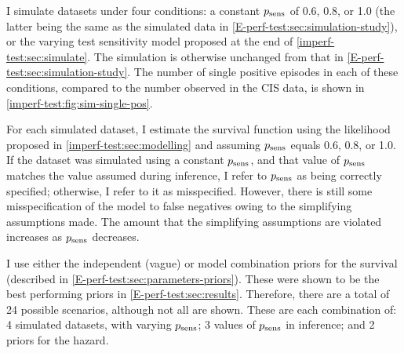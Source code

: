 \documentclass[thesis.tex]{subfiles}
\begin{document}
I simulate datasets under four conditions: a constant $p_\text{sens}$ of 0.6, 0.8, or 1.0 (the latter being the same as the simulated data in \cref{E-perf-test:sec:simulation-study}), or the varying test sensitivity model proposed at the end of \cref{imperf-test:sec:simulate}.
The simulation is otherwise unchanged from that in \cref{E-perf-test:sec:simulation-study}.
The number of single positive episodes in each of these conditions, compared to the number observed in the CIS data, is shown in \cref{imperf-test:fig:sim-single-pos}.

For each simulated dataset, I estimate the survival function using the likelihood proposed in \cref{imperf-test:sec:modelling} and assuming $p_\text{sens}$ equals 0.6, 0.8, or 1.0.
If the dataset was simulated using a constant $p_\text{sens}$, and that value of $p_\text{sens}$ matches the value assumed during inference, I refer to $p_\text{sens}$ as being correctly specified; otherwise, I refer to it as misspecified.
However, there is still some misspecification of the model to false negatives owing to the simplifying assumptions made.
The amount that the simplifying assumptions are violated increases as $p_\text{sens}$ decreases.

I use either the independent (vague) or model combination priors for the survival (described in \cref{E-perf-test:sec:parameters-priors}).
These were shown to be the best performing priors in \cref{E-perf-test:sec:results}.
Therefore, there are a total of 24 possible scenarios, although not all are shown.
These are each combination of: 4 simulated datasets, with varying $p_\text{sens}$; 3 values of $p_\text{sens}$ in inference; and 2 priors for the hazard.
\end{document}
